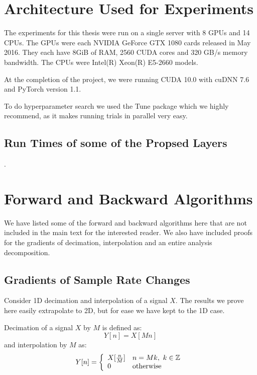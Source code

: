 \chapter{Architecture Used for Experiments} \label{app:arch}
The experiments for this thesis were run on a single server with 8 GPUs and 14
CPUs. The GPUs were each NVIDIA GeForce GTX 1080 cards released in May 2016.
They each have 8GiB of RAM, 2560 CUDA cores and 320 GB/s memory bandwidth.
The CPUs were Intel(R) Xeon(R) E5-2660 models. 

At the completion of the project, we were running CUDA 10.0 with cuDNN 7.6 and 
PyTorch version 1.1.

To do hyperparameter search we used the Tune package \cite{liaw2018tune} which
we highly recommend, as it makes running trials in parallel very easy.

\section{Run Times of some of the Propsed Layers}
.

\chapter{Forward and Backward Algorithms} \label{app:ch3:fwd_bwd}
We have listed some of the forward and backward algorithms here that are not
included in the main text for the interested reader. We also have included 
proofs for the gradients of decimation, interpolation and an entire analysis
decomposition.

\section{Gradients of Sample Rate Changes}\label{sec:app:samplegrads}
Consider 1D decimation and interpolation of a signal $X$. The results we prove
here easily extrapolate to 2D, but for ease we have kept to the 1D case. 

Decimation of a signal $X$ by $M$ is defined as:
\begin{equation}
  Y[n] = X[Mn] \label{eq:app:decimation}
\end{equation}
and interpolation by $M$ as:
\begin{equation}
  Y[n] = \left\{ \begin{array}{ll}
    X[\frac{n}{M}] & n = Mk,\ k\in \mathbb{Z}^{} \\
    0 & \text{otherwise} \\ 
  \end{array}\right.
  \label{eq:app:interpolation}
\end{equation}

